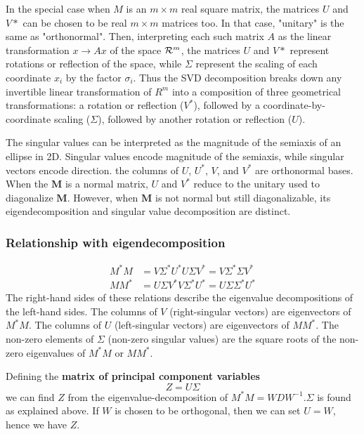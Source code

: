 \documentclass[12pt, letterpaper]{article}
\theoremstyle{definition}
\let\tb\textbf
\begin{document}
In the special case when $M$ is an $m \times m$ real square matrix, the matrices $U$ and $V*$ can be chosen to be real $m \times m$ matrices too. In that case, "unitary" is the same as "orthonormal". Then, interpreting each such matrix $A$ as the linear transformation $x \rightarrow Ax$ of the space $\CMcal{R}^m$, the matrices $U$ and $V*$ represent rotations or reflection of the space, while $\Sigma$ represent the scaling of each coordinate $x_i$ by the factor $\sigma_i$. Thus the SVD decomposition breaks down any invertible linear transformation of $R^m$ into a composition of three geometrical transformations: a rotation or reflection ($V^*$), followed by a coordinate-by-coordinate scaling ($\Sigma$), followed by another rotation or reflection ($U$).

The singular values can be interpreted as the magnitude of the semiaxis of an ellipse in 2D. Singular values encode magnitude of the semiaxis, while singular vectors encode direction. the columns of $U$, $U^*$, $V$, and $V^*$ are orthonormal bases. When the $\mathbf {M}$ is a normal matrix, $U$ and $V^*$ reduce to the unitary used to diagonalize $\mathbf {M}$. However, when 
$\mathbf {M}$  is not normal but still diagonalizable, its eigendecomposition and singular value decomposition are distinct.


\subsubsection{Relationship with eigendecomposition}
\label{SVDEigenDec}
\begin{equation}
\begin{aligned}
M^*M &= V \Sigma^* U^*U \Sigma V^* = V\Sigma^* \Sigma V^*\\
MM^* &= U \Sigma V^*V \Sigma^* U^* = U \Sigma \Sigma^* U^*
\end{aligned}
\end{equation}
The right-hand sides of these relations describe the eigenvalue decompositions of the left-hand sides. The columns of $V$ (right-singular vectors) are eigenvectors of $M^*M$. The columns of $U$ (left-singular vectors) are eigenvectors of $MM^*$. The non-zero elements of $\Sigma$ (non-zero singular values) are the square roots of the non-zero eigenvalues of $M^*M$ or $MM^*$.

Defining the \tb{matrix of principal component variables}
\begin{equation}
Z = U\Sigma
\end{equation}
we can find $Z$ from the eigenvalue-decomposition of $M^*M = W D W^{-1}$.$\Sigma$ is found as explained above. If $W$ is chosen to be orthogonal, then we can set $U=W$, hence we have $Z$.
\end{document}
